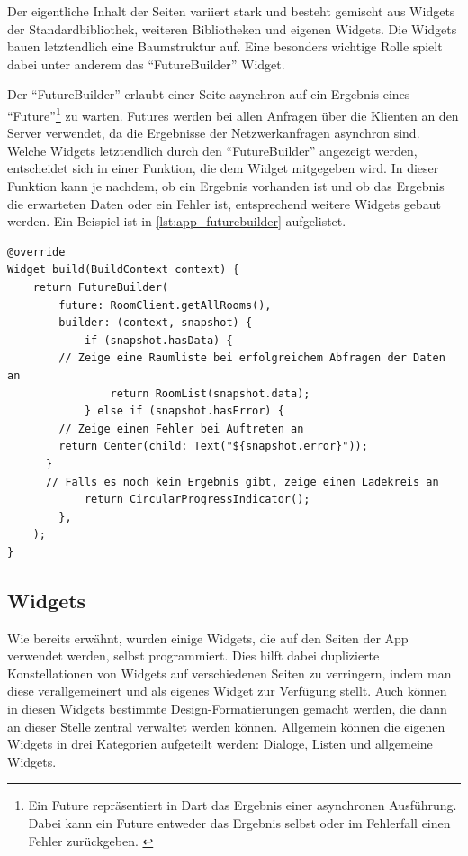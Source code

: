 Der eigentliche Inhalt der Seiten variiert stark und besteht gemischt aus Widgets der Standardbibliothek, weiteren Bibliotheken
und eigenen Widgets.
Die Widgets bauen letztendlich eine Baumstruktur auf.
Eine besonders wichtige Rolle spielt dabei unter anderem das \enquote{FutureBuilder} Widget.

Der \enquote{FutureBuilder} erlaubt einer Seite asynchron auf ein Ergebnis eines \enquote{Future}\footnote{Ein Future repräsentiert in Dart das Ergebnis
einer asynchronen Ausführung. Dabei kann ein Future entweder das Ergebnis selbst oder im Fehlerfall einen Fehler zurückgeben. \cite{dart2020}}
 zu warten.
Futures werden bei allen Anfragen über die Klienten an den Server verwendet, da die Ergebnisse der Netzwerkanfragen asynchron sind.
Welche Widgets letztendlich durch den \enquote{FutureBuilder} angezeigt werden, entscheidet sich in einer Funktion,
die dem Widget mitgegeben wird.
In dieser Funktion kann je nachdem, ob ein Ergebnis vorhanden ist und ob das Ergebnis die erwarteten Daten oder
ein Fehler ist, entsprechend weitere Widgets gebaut werden.
Ein Beispiel ist in \autoref{lst:app_futurebuilder} aufgelistet.

\begin{lstlisting}[caption={Beispiel für die Verwendung des \enquote{FutureBuilder}},label={lst:app_futurebuilder},tabsize=2]
@override
Widget build(BuildContext context) {
	return FutureBuilder(
		future: RoomClient.getAllRooms(),
		builder: (context, snapshot) {
			if (snapshot.hasData) {
        // Zeige eine Raumliste bei erfolgreichem Abfragen der Daten an
				return RoomList(snapshot.data);
			} else if (snapshot.hasError) {
        // Zeige einen Fehler bei Auftreten an
        return Center(child: Text("${snapshot.error}"));
      }
      // Falls es noch kein Ergebnis gibt, zeige einen Ladekreis an
			return CircularProgressIndicator();
		},
	);
}
\end{lstlisting}

\FloatBarrier
\subsection{Widgets}

Wie bereits erwähnt, wurden einige Widgets, die auf den Seiten der App verwendet werden, selbst programmiert.
Dies hilft dabei duplizierte Konstellationen von Widgets auf verschiedenen Seiten zu verringern, indem man diese
verallgemeinert und als eigenes Widget zur Verfügung stellt.
Auch können in diesen Widgets bestimmte Design-Formatierungen gemacht werden, die dann an dieser Stelle zentral verwaltet
werden können.
Allgemein können die eigenen Widgets in drei Kategorien aufgeteilt werden:
Dialoge, Listen und allgemeine Widgets.

